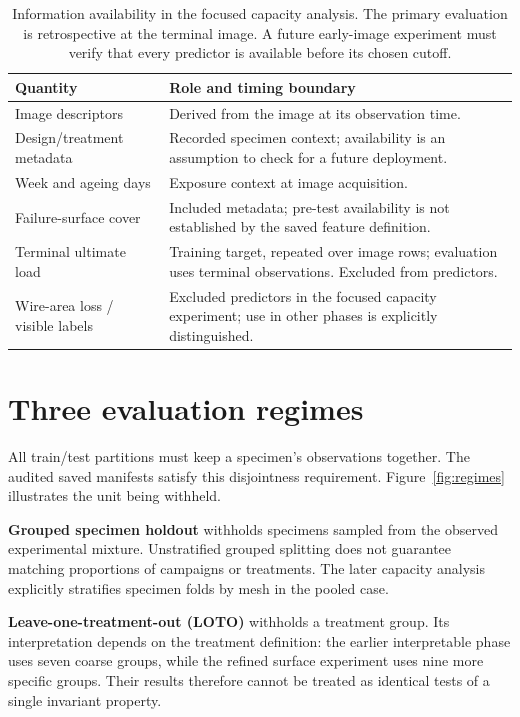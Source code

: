\begin{table}[htbp]\centering\small
\caption[Information available at prediction time]{Information availability in the focused capacity analysis. The primary evaluation is retrospective at the terminal image. A future early-image experiment must verify that every predictor is available before its chosen cutoff.}\label{tab:availability}
\begin{tabularx}{\textwidth}{p{}X}\toprule
Quantity & Role and timing boundary\\\midrule
Image descriptors & Derived from the image at its observation time.\\
Design/treatment metadata & Recorded specimen context; availability is an assumption to check for a future deployment.\\
Week and ageing days & Exposure context at image acquisition.\\
Failure-surface cover & Included metadata; pre-test availability is not established by the saved feature definition.\\
Terminal ultimate load & Training target, repeated over image rows; evaluation uses terminal observations. Excluded from predictors.\\
Wire-area loss / visible labels & Excluded predictors in the focused capacity experiment; use in other phases is explicitly distinguished.\\\bottomrule
\end{tabularx}
\end{table}

\section{Three evaluation regimes}\label{sec:regimes}
All train/test partitions must keep a specimen's observations together. The audited saved manifests satisfy this disjointness requirement. Figure~\ref{fig:regimes} illustrates the unit being withheld.

\textbf{Grouped specimen holdout} withholds specimens sampled from the observed experimental mixture. Unstratified grouped splitting does not guarantee matching proportions of campaigns or treatments. The later capacity analysis explicitly stratifies specimen folds by mesh in the pooled case.

\textbf{Leave-one-treatment-out (LOTO)} withholds a treatment group. Its interpretation depends on the treatment definition: the earlier interpretable phase uses seven coarse groups, while the refined surface experiment uses nine more specific groups. Their results therefore cannot be treated as identical tests of a single invariant property.

